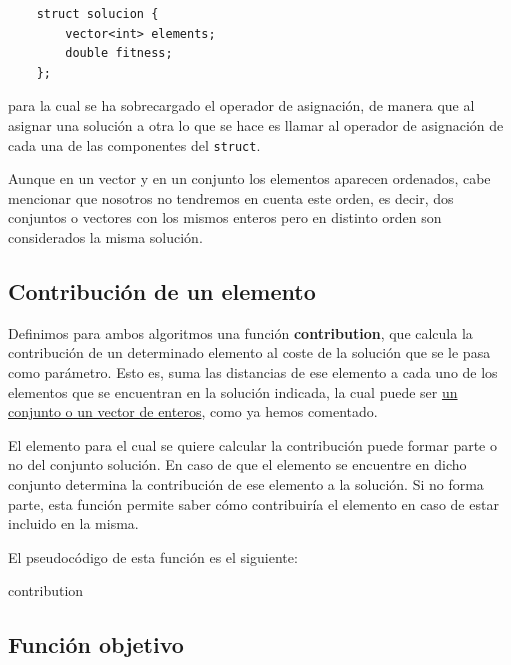 \documentclass[11pt,a4paper]{article}
\begin{document}
	\begin{lstlisting}
	struct solucion {
		vector<int> elements;
		double fitness;
	};
	\end{lstlisting}
	
	para la cual se ha sobrecargado el operador de asignación, de manera que al asignar una solución a otra lo que se hace es llamar al operador de asignación de cada una de las componentes del \lstinline|struct|.
	
	Aunque en un vector y en un conjunto los elementos aparecen ordenados, cabe mencionar que nosotros no tendremos en cuenta este orden, es decir, dos conjuntos o vectores con los mismos enteros pero en distinto orden son considerados la misma solución. 
	
	\subsection{Contribución de un elemento}
	
	Definimos para ambos algoritmos una función \textbf{contribution}, que calcula la contribución de un determinado elemento al coste de la solución que se le pasa como parámetro. Esto es, suma las distancias de ese elemento a cada uno de los elementos que se encuentran en la solución indicada, la cual puede ser \underline{un conjunto o un vector de enteros}, como ya hemos comentado. 
	
	El elemento para el cual se quiere calcular la contribución puede formar parte o no del conjunto solución. En caso de que el elemento se encuentre en dicho conjunto determina la contribución de ese elemento a la solución. Si no forma parte, esta función permite saber cómo contribuiría el elemento en caso de estar incluido en la misma. 
	
	El pseudocódigo de esta función es el siguiente:
		\begin{algorithm}
		\caption{\sc contribution}
	\end{algorithm}


\subsection{Función objetivo}
	
\end{document}
